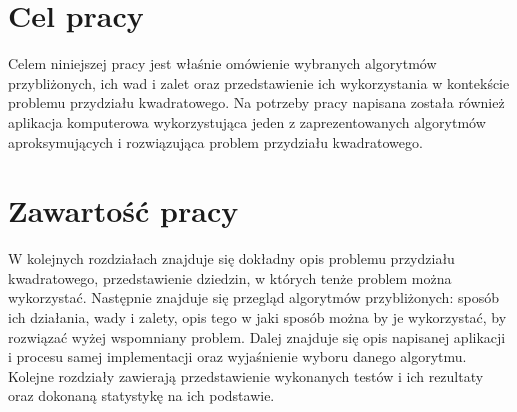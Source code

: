 \section{Cel pracy}
\label{sec:cel}
Celem niniejszej pracy jest właśnie omówienie wybranych algorytmów  przybliżonych, ich wad i zalet oraz przedstawienie ich wykorzystania w kontekście problemu przydziału kwadratowego. Na potrzeby pracy napisana została również aplikacja komputerowa wykorzystująca jeden z zaprezentowanych algorytmów aproksymujących i rozwiązująca problem przydziału kwadratowego.

\section{Zawartość pracy}
\label{sec:zawartosc}
W kolejnych rozdziałach znajduje się dokładny opis problemu przydziału kwadratowego, przedstawienie dziedzin, w których tenże problem można wykorzystać. Następnie znajduje się przegląd algorytmów przybliżonych: sposób ich działania, wady i zalety, opis tego w jaki sposób można by je wykorzystać, by rozwiązać wyżej wspomniany problem. Dalej znajduje się opis napisanej aplikacji i procesu samej implementacji oraz wyjaśnienie wyboru danego algorytmu. Kolejne rozdziały zawierają przedstawienie wykonanych testów i ich rezultaty oraz dokonaną statystykę na ich podstawie.
